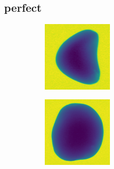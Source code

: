 \documentclass[11pt]{article}
\begin{document}
\subsection{perfect}

\begin{figure}[!h]
    \captionsetup[subfigure]{labelformat=empty}
     \centering
     \begin{subfigure}[b]{0.22\textwidth}
         \centering
         \includegraphics[width=\textwidth]{figurer/potato_dataset/perfect/perfect_0.jpg}
         \caption{}
         \label{fig:perfect_0}
     \end{subfigure}
     \hfill
     \begin{subfigure}[b]{0.22\textwidth}
         \centering
         \includegraphics[width=\textwidth]{figurer/potato_dataset/perfect/perfect_1.jpg}

\end{subfigure}
\end{figure}
\end{document}
